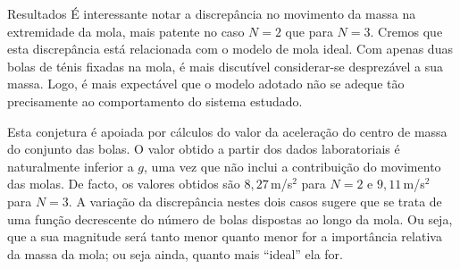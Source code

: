 \documentclass[final]{beamer}
\newlength{\colwidth}
\begin{document}
\begin{frame}[t]
\begin{columns}[t]
\begin{column}{\colwidth}
\begin{block}{Resultados}
É interessante notar a discrepância no movimento da massa na extremidade
da mola, mais patente no caso $N=2$ que para $N=3$. Cremos que esta discrepância
está relacionada com o modelo de mola ideal. Com apenas duas bolas de ténis
fixadas na mola, é mais discutível considerar-se desprezável a sua massa. Logo,
é mais expectável que o modelo adotado não se adeque tão precisamente ao
comportamento do sistema estudado.

Esta conjetura é apoiada por cálculos do valor da aceleração do centro de massa
do conjunto das bolas. O valor obtido a partir dos dados laboratoriais é
naturalmente inferior a $g$, uma vez que não inclui a contribuição do movimento
das molas. De facto, os valores obtidos são $8,27$\,m/s$^2$ para $N=2$ e
$9,11$\,m/s$^2$ para $N=3$.  A variação da discrepância nestes dois casos
sugere que se trata de uma função decrescente do número de bolas dispostas ao
longo da mola.  Ou seja, que a sua magnitude será tanto menor quanto menor for a
importância relativa da massa da mola; ou seja ainda, quanto mais ``ideal'' ela
for.
	

\end{block}
\end{column}
\end{columns}
\end{frame}
\end{document}

